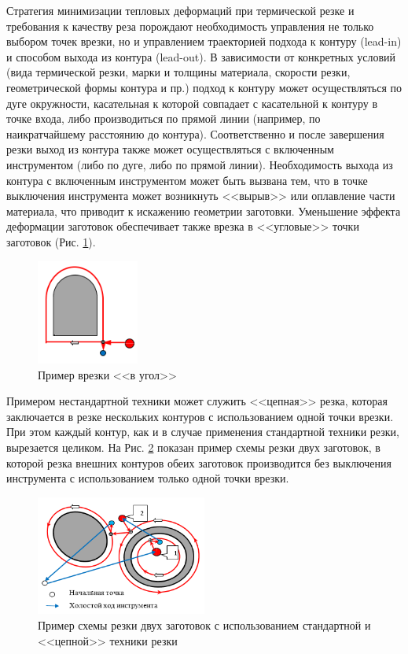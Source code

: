 \documentclass[11pt,twoside]{report}
\newcounter{cor}
\begin{document}
Стратегия минимизации тепловых деформаций при термической резке
и требования к качеству реза порождают необходимость управления
не только выбором точек врезки,
но и управлением траекторией подхода к контуру (lead-in)
и способом выхода из контура (lead-out).
В зависимости от конкретных условий
(вида термической резки, марки и толщины материала,
скорости резки, геометрической формы контура и пр.)
подход к контуру может осуществляться по дуге окружности,
касательная к которой совпадает с касательной к контуру в точке входа,
либо производиться по прямой линии
(например, по наикратчайшему расстоянию до контура).
Соответственно и после завершения резки выход из контура
также может осуществляться с включенным инструментом
(либо по дуге, либо по прямой линии).
Необходимость выхода из контура с включенным
инструментом может быть вызвана тем,
что в точке выключения инструмента может возникнуть
<<вырыв>> или оплавление части материала,
что приводит к искажению геометрии заготовки.
Уменьшение эффекта деформации заготовок обеспечивает
также врезка в <<угловые>> точки заготовок
(Рис. \ref{corner}).

\begin{figure}
  \begin{center}
  \includegraphics[width=0.3\textwidth]{corner.png}
  \caption{Пример врезки <<в угол>>}
  \label{corner}
  \end{center}
\end{figure}

Примером нестандартной техники
может служить <<цепная>> резка,
которая заключается в резке нескольких контуров с
использованием одной точки врезки.
При этом каждый контур,
как и в случае применения стандартной техники резки,
вырезается целиком.
На Рис. \ref{chain}
показан пример схемы резки двух заготовок,
в которой резка внешних контуров обеих заготовок
производится без выключения инструмента
с использованием только одной точки врезки.

\begin{figure}
  \begin{center}
  \includegraphics[width=0.5\textwidth]{chain.png}
  \caption{Пример схемы резки двух заготовок с использованием стандартной и <<цепной>> техники резки}
  \label{chain}
  \end{center}
\end{figure}
\end{document}
